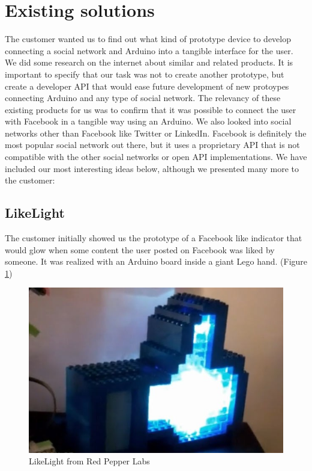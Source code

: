 \section{Existing solutions}
The customer wanted us to find out what kind of prototype device to develop connecting a social network and Arduino
into a tangible interface for the user. We did some research on the internet about similar and related products.  It is 
important to specify that our task was not to create another prototype, but create a  developer API that would ease 
future development of new protoypes connecting Arduino and any type of social network. The relevancy of these 
existing products for us was to confirm that it was possible to connect the user with Facebook in a tangible way using
 an Arduino. We also looked into social networks other than Facebook like Twitter or LinkedIn. Facebook is definitely the 
most popular social network out there, but it uses a proprietary API that is not compatible with the other social 
networks or open API implementations. We have included our most interesting ideas below, although we presented
many more to the customer:

\newpage

\subsection{LikeLight}
The customer initially showed us the prototype of a Facebook like indicator that would glow when some content the
user posted on Facebook was liked by someone. It was realized with an Arduino board inside a giant Lego hand. 
(Figure \ref{fig:prestudies-likehand})

\begin{figure}[h!]
\centering \includegraphics[scale=0.85]{img/prestudies-likehand} \caption{LikeLight from Red Pepper Labs}

\label{fig:prestudies-likehand}
\end{figure}

